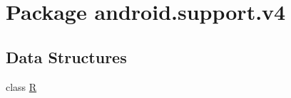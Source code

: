 \hypertarget{namespaceandroid_1_1support_1_1v4}{}\section{Package android.\+support.\+v4}
\label{namespaceandroid_1_1support_1_1v4}
\subsection*{Data Structures}
\begin{DoxyCompactItemize}
\item 
class \mbox{\hyperlink{classandroid_1_1support_1_1v4_1_1_r}{R}}
\end{DoxyCompactItemize}
